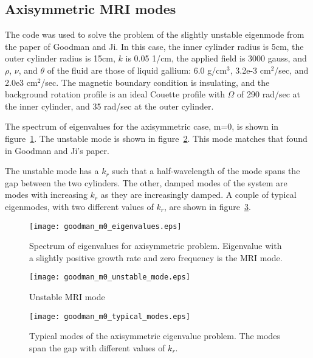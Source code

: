 \documentclass[letterpaper]{article}
\begin{document}
\subsection{Axisymmetric MRI modes}

The code was used to solve the problem of the slightly unstable eigenmode from the paper of Goodman and Ji.  In this case, the inner cylinder radius is 5cm, the outer cylinder radius is 15cm, $k$ is 0.05 1/cm, the applied field is 3000 gauss, and $\rho$, $\nu$, and $\theta$ of the fluid are those of liquid gallium: 6.0 g/cm$^3$, 3.2e-3 cm$^2$/sec, and 2.0e3 cm$^2$/sec.  The magnetic boundary condition is insulating, and the background rotation profile is an ideal Couette profile with $\Omega$ of 290 rad/sec at the inner cylinder, and 35 rad/sec at the outer cylinder.

The spectrum of eigenvalues for the axisymmetric case, m=0, is shown in figure~\ref{fig:goodmanm0eigenvalues}.  The unstable mode is shown in figure~\ref{fig:goodmanm0unstablemode}.  This mode matches that found in Goodman and Ji's paper.

The unstable mode has a $k_r$ such that a half-wavelength of the mode spans the gap between the two cylinders.  The other, damped modes of the system are modes with increasing $k_r$ as they are increasingly damped.  A couple of typical eigenmodes, with two different values of $k_r$, are shown in figure~\ref{fig:goodmanm0typicalmodes}.

\begin{figure}
\begin{center}
\texttt{[image: goodman\_m0\_eigenvalues.eps]}
\caption{Spectrum of eigenvalues for axisymmetric problem.  Eigenvalue with a slightly positive growth rate and zero frequency is the MRI mode.}
\label{fig:goodmanm0eigenvalues}
\end{center}
\end{figure}


\begin{figure}
\begin{center}
\texttt{[image: goodman\_m0\_unstable\_mode.eps]}
\caption{Unstable MRI mode}
\label{fig:goodmanm0unstablemode}
\end{center}
\end{figure}

\begin{figure}
\begin{center}
\texttt{[image: goodman\_m0\_typical\_modes.eps]}
\caption{Typical modes of the axisymmetric eigenvalue problem.  The modes span the gap with different values of $k_r$.}
\label{fig:goodmanm0typicalmodes}
\end{center}
\end{figure}
\end{document}
